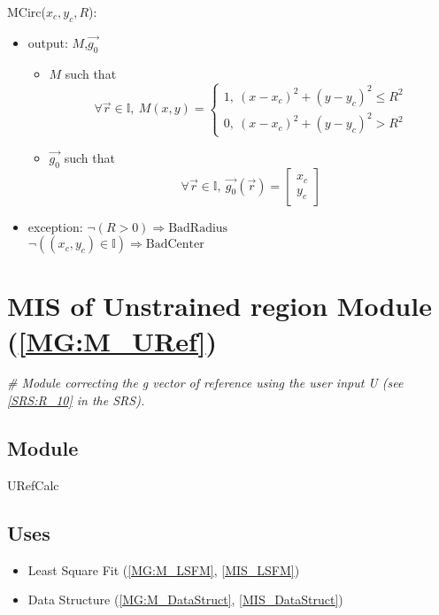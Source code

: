 \documentclass[12pt, titlepage]{article}
\begin{document}
\noindent MCirc($x_c,y_c,R$):
\begin{itemize} 
\item output: $M$,$\overrightarrow{g_0}$
	\begin{itemize}
	\item $M$ such that
	\begin{equation*}
	\forall \vec{r} \in \mathbb{I}, \ M(x,y)=\begin{cases}
	1, \ (x-x_c)^2+(y-y_c)^2\leq R^2 \\
	0, \ (x-x_c)^2+(y-y_c)^2> R^2
	\end{cases}
	\end{equation*}
	\item $\overrightarrow{g_0}$ such that
	\begin{equation*}
	\forall \vec{r} \in \mathbb{I}, \ \overrightarrow{g_0}(\vec{r})=\begin{bmatrix}
	x_c\\
	y_c
	\end{bmatrix}
	\end{equation*}
	\end{itemize}
\item exception:
\newline
$\neg (R>0) \Rightarrow \text{BadRadius}$\\
$\neg ((x_c,y_c) \in \mathbb{I}) \Rightarrow \text{BadCenter}$
\end{itemize}

\section{MIS of Unstrained region Module (\texorpdfstring{\cref{MG:M_URef}}))} 
\label{MIS_URef}

\noindent\textit{{\#} Module correcting the g vector of reference using the user 
input U (see \cref{SRS:R_10} in the SRS).}

\subsection{Module}
URefCalc
\subsection{Uses}
\begin{itemize}
\item Least Square Fit (\cref{MG:M_LSFM}, \cref{MIS_LSFM})
\item Data Structure (\cref{MG:M_DataStruct}, \cref{MIS_DataStruct})
\end{itemize}
\end{document}
